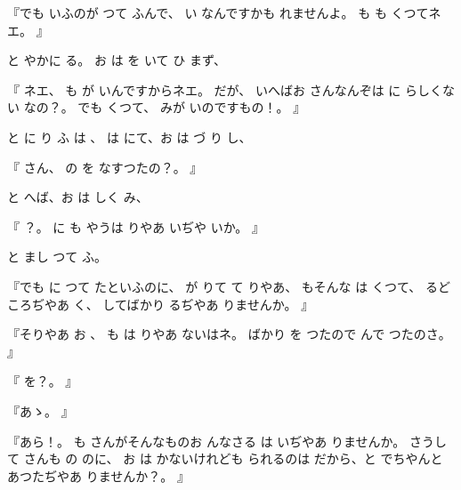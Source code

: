『でも
いふのが
つて
ふんで、
い
なんですかも
れませんよ。
も
も
くつてネエ。
』

と
やかに
る。
お
は
を
いて
ひ
まず、

『
ネエ、
も
が
いんですからネエ。
だが、
いへばお
さんなんぞは
に
らしくない
なの？。
でも
くつて、
みが
いのですもの！。
』

と
に
り
ふ
は
、
は
にて、お
は
づ
り
し、

『
さん、
の
を
なすつたの？。
』

と
へば、お
は
しく
み、

『
？。
に
も
やうは
りやあ
いぢや
いか。
』

と
まし
つて
ふ。

『でも
に
つて
たといふのに、
が
りて
て
りやあ、
もそんな
は
くつて、
るどころぢやあ
く、
してばかり
るぢやあ
りませんか。
』

『そりやあ
お
、
も
は
りやあ
ないはネ。
ばかり
を
つたので
んで
つたのさ。
』

『
を？。
』

『あゝ。
』

『あら！。
も
さんがそんなものお
んなさる
は
いぢやあ
りませんか。
さうして
さんも
の
のに、
お
は
かないけれども
られるのは
だから、と
でちやんと
あつたぢやあ
りませんか？。
』

